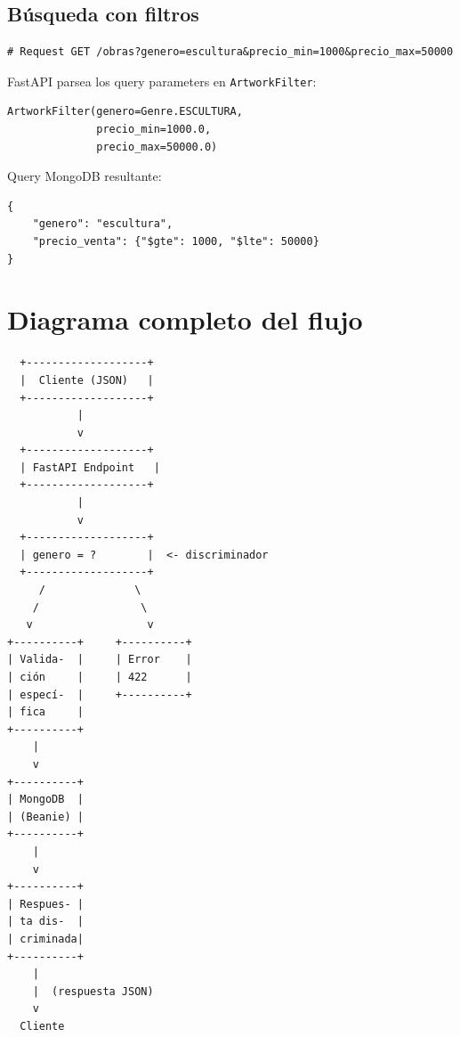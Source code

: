 \documentclass[12pt,a4paper]{article}
\begin{document}
\subsection{Búsqueda con filtros}

\begin{lstlisting}
# Request GET /obras?genero=escultura&precio_min=1000&precio_max=50000
\end{lstlisting}

FastAPI parsea los query parameters en \texttt{ArtworkFilter}:
\begin{lstlisting}
ArtworkFilter(genero=Genre.ESCULTURA,
              precio_min=1000.0,
              precio_max=50000.0)
\end{lstlisting}

Query MongoDB resultante:
\begin{lstlisting}
{
    "genero": "escultura",
    "precio_venta": {"$gte": 1000, "$lte": 50000}
}
\end{lstlisting}

\section{Diagrama completo del flujo}

\begin{center}
\begin{minipage}{0.9\textwidth}
\footnotesize
\begin{verbatim}
  +-------------------+
  |  Cliente (JSON)   |
  +-------------------+
           |
           v
  +-------------------+
  | FastAPI Endpoint   |
  +-------------------+
           |
           v
  +-------------------+
  | genero = ?        |  <- discriminador
  +-------------------+
     /              \
    /                \
   v                  v
+----------+     +----------+
| Valida-  |     | Error    |
| ción     |     | 422      |
| especí-  |     +----------+
| fica     |
+----------+
    |
    v
+----------+
| MongoDB  |
| (Beanie) |
+----------+
    |
    v
+----------+
| Respues- |
| ta dis-  |
| criminada|
+----------+
    |
    |  (respuesta JSON)
    v
  Cliente
\end{verbatim}
\end{minipage}
\end{center}

\end{document}
